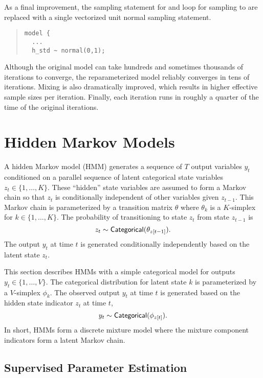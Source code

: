 As a final improvement, the sampling statement for  and
loop for sampling  to  are replaced with a
single vectorized unit normal sampling statement.
%
\begin{quote}
\begin{Verbatim}[fontsize=\small]
model {
  ...
  h_std ~ normal(0,1);
\end{Verbatim}
\end{quote}
%
Although the original model can take hundreds and sometimes thousands
of iterations to converge, the reparameterized model reliably
converges in tens of iterations.  Mixing is also dramatically
improved, which results in higher effective sample sizes per
iteration.  Finally, each iteration runs in roughly a quarter of the
time of the original iterations.

\section{Hidden Markov Models}\label{hmms.section}

A hidden Markov model (HMM) generates a sequence of $T$ output
variables $y_t$ conditioned on a parallel sequence of latent
categorical state variables $z_t \in \{1,\ldots,K\}$.  These
``hidden'' state variables are assumed to form a Markov chain so that
$z_t$ is conditionally independent of other variables given $z_{t-1}$.
This Markov chain is parameterized by a transition matrix $\theta$
where $\theta_k$ is a $K$-simplex for $k \in \{1,\ldots,K\}$.  The
probability of transitioning to state $z_t$ from state $z_{t-1}$ is
\[
z_t \sim \mbox{\sf Categorical}(\theta_{z[t-1]}).
\]
The output $y_t$ at time $t$ is generated conditionally independently
based on the latent state $z_t$.  

This section describes HMMs with a simple categorical model for
outputs $y_t \in \{1,\ldots,V\}$.  The categorical distribution for
latent state $k$ is parameterized by a $V$-simplex $\phi_k$.  The
observed output $y_t$ at time $t$ is generated based on the hidden
state indicator $z_t$ at time $t$,
\[
y_t \sim \mbox{\sf Categorical}(\phi_{z[t]}).
\]
In short, HMMs form a discrete mixture model where the mixture
component indicators form a latent Markov chain.



\subsection{Supervised Parameter Estimation}

